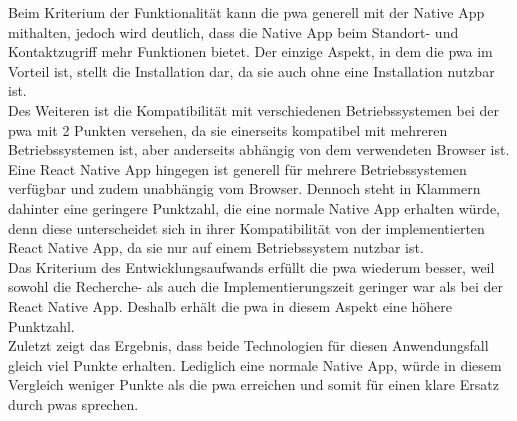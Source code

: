 Beim Kriterium der Funktionalität kann die \ac{pwa} generell mit der Native App mithalten, jedoch wird deutlich, dass die Native App beim Standort- und Kontaktzugriff mehr Funktionen bietet.
Der einzige Aspekt, in dem die \ac{pwa} im Vorteil ist, stellt die Installation dar, da sie auch ohne eine Installation nutzbar ist.\\
Des Weiteren ist die Kompatibilität mit verschiedenen Betriebssystemen bei der \ac{pwa} mit 2 Punkten versehen, da sie einerseits kompatibel mit mehreren Betriebssystemen ist, aber anderseits abhängig von dem verwendeten Browser ist.
Eine React Native App hingegen ist generell für mehrere Betriebssystemen verfügbar und zudem unabhängig vom Browser.
Dennoch steht in Klammern dahinter eine geringere Punktzahl, die eine normale Native App erhalten würde, denn diese unterscheidet sich in ihrer Kompatibilität von der implementierten React Native App, da sie nur auf einem Betriebssystem nutzbar ist.\\
Das Kriterium des Entwicklungsaufwands erfüllt die \ac{pwa} wiederum besser, weil sowohl die Recherche- als auch die Implementierungszeit geringer war als bei der React Native App.
Deshalb erhält die \ac{pwa} in diesem Aspekt eine höhere Punktzahl.\\
Zuletzt zeigt das Ergebnis, dass beide Technologien für diesen Anwendungsfall gleich viel Punkte erhalten.
Lediglich eine normale Native App, würde in diesem Vergleich weniger Punkte als die \ac{pwa} erreichen und somit für einen klare Ersatz durch \acp{pwa} sprechen.

